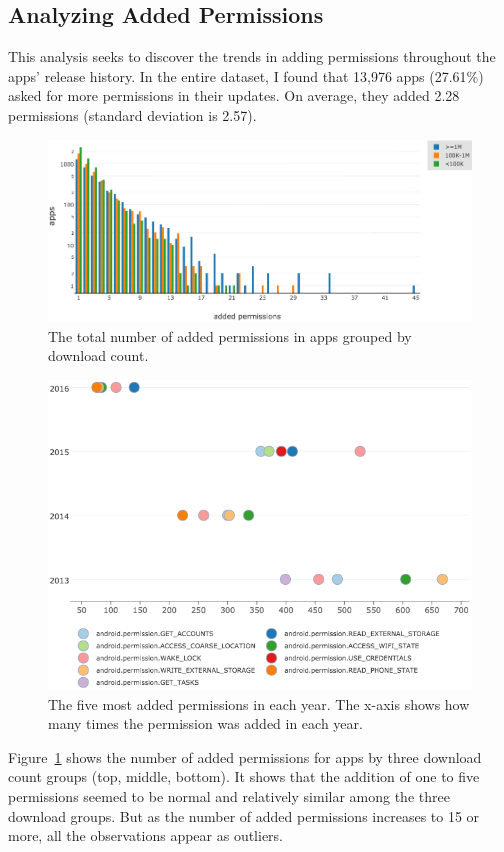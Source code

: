 \subsection{Analyzing Added Permissions}
This analysis seeks to discover the trends in adding permissions throughout the apps' release history.
In the entire dataset, I found that 13,976 apps (27.61\%) asked for more permissions in their updates.
On average, they added 2.28 permissions (standard deviation is 2.57).
\begin{figure}[H]
	\includegraphics[scale=0.50]{figures/findings/added_permissions_downloads.png}
	\caption{The total number of added permissions in apps grouped by download count.}
	\label{fig:added_permissions_downloads}
\end{figure}
\begin{figure}[H]
	\includegraphics[scale=0.60]{figures/findings/added_permissions_over_time.png}
	\caption{The five most added permissions in each year. The x-axis shows how many times the permission was added in each year.}
	\label{fig:added_permissions_over_time}
\end{figure}
Figure~\ref{fig:added_permissions_downloads} shows the number of added permissions for apps by three download count groups (top, middle, bottom).
It shows that the addition of one to five permissions seemed to be normal and relatively similar among the three download groups.
But as the number of added permissions increases to 15 or more, all the observations appear as outliers.

